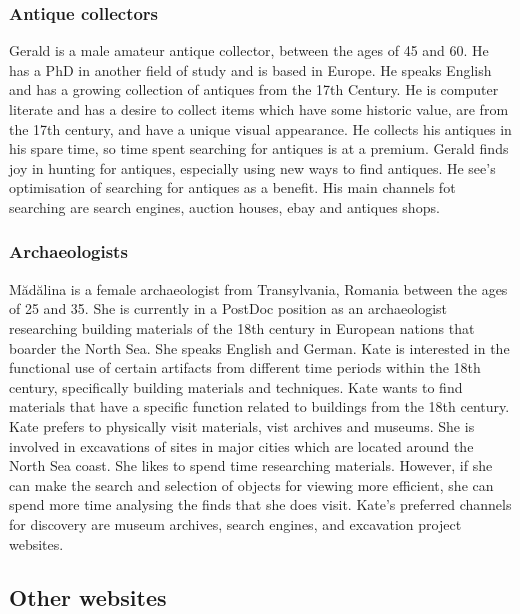 \subsubsection{Antique collectors}

Gerald is a male amateur antique collector, between the ages of 45 and 60.  He has a PhD in another field of study and is based in Europe.  He speaks English and has a growing collection of antiques from the 17th Century.  He is computer literate and has a desire to collect items which have some historic value, are from the 17th century, and have a unique visual appearance.  He collects his antiques in his spare time, so time spent searching for antiques is at a premium.  Gerald finds joy in hunting for antiques, especially using new ways to find antiques.  He see's optimisation of searching for antiques as a benefit.  His main channels fot searching are search engines, auction houses, ebay and antiques shops.

\subsubsection{Archaeologists}

Mădălina is a female archaeologist from Transylvania, Romania between the ages of 25 and 35.  She is currently in a PostDoc position as an archaeologist researching building materials of the 18th century in European nations that boarder the North Sea.  She speaks English and German.  Kate is interested in the functional use of certain artifacts from different time periods within the 18th century, specifically building materials and techniques. Kate wants to find materials that have a specific function related to buildings from the 18th century.  Kate prefers to physically visit materials, vist archives and museums.  She is involved in excavations of sites in major cities which are located around the North Sea coast.  She likes to spend time researching materials.  However, if she can make the search and selection of objects for viewing more efficient, she can spend more time analysing the finds that she does visit.  Kate's preferred channels for discovery are museum archives, search engines, and excavation project websites.

\subsection{Other websites}

